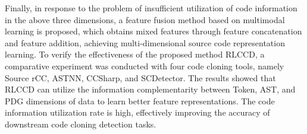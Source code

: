 \begin{abstractEn}
  Finally, in response to the problem of insufficient utilization of code information in the above three dimensions, a feature fusion method based on multimodal learning is proposed, which obtains mixed features through feature concatenation and feature addition, achieving multi-dimensional source code representation learning. To verify the effectiveness of the proposed method RLCCD, a comparative experiment was conducted with four code cloning tools, namely Source rCC, ASTNN, CCSharp, and SCDetector. The results showed that RLCCD can utilize the information complementarity between Token, AST, and PDG dimensions of data to learn better feature representations. The code information utilization rate is high, effectively improving the accuracy of downstream code cloning detection tasks.

\end{abstractEn}
